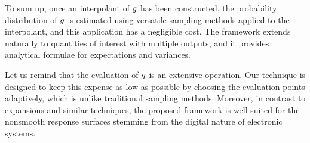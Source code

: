 To sum up, once an interpolant of $g$ has been constructed, the probability
distribution of $g$ is estimated using versatile sampling methods applied to
the interpolant, and this application has a negligible cost. The framework
extends naturally to quantities of interest with multiple outputs, and it
provides analytical formulae for expectations and variances.

Let us remind that the evaluation of $g$ is an extensive operation. Our
technique is designed to keep this expense as low as possible by choosing the
evaluation points adaptively, which is unlike traditional sampling methods.
Moreover, in contrast to  expansions and similar techniques, the proposed
framework is well suited for the nonsmooth response surfaces stemming from the
digital nature of electronic systems.
